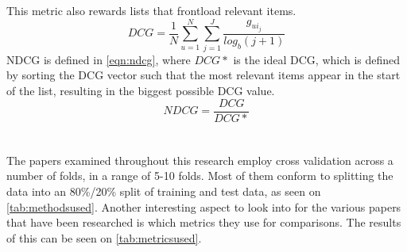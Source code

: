 This metric also rewards lists that frontload relevant items.
\begin{equation}
    \label{eqn:dcg}
    DCG = \frac{1}{N} \sum\limits_{u=1}^N \sum\limits_{j = 1}^J \frac{g_{ui_j}}{log_b (j+1)}
\end{equation}
NDCG is defined in \autoref{eqn:ndcg}, where $DCG*$ is the ideal DCG, which is defined by sorting the DCG vector such that the most relevant items appear in the start of the list\cite{dcgpaper}, resulting in the biggest possible DCG value.
\begin{equation}
    \label{eqn:ndcg}
    NDCG = \frac{DCG}{DCG*}
\end{equation}
\\\\
The papers examined throughout this research employ cross validation across a number of folds, in a range of 5-10 folds.
Most of them conform to splitting the data into an 80\%/20\% split of training and test data, as seen on \autoref{tab:methodsused}.
Another interesting aspect to look into for the various papers that have been researched is which metrics they use for comparisons.
The results of this can be seen on \autoref{tab:metricsused}.

